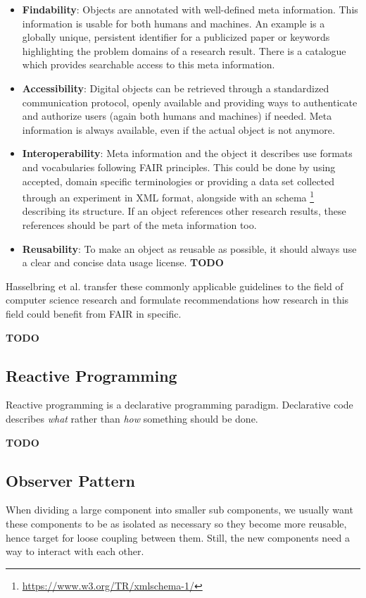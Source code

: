 \documentclass[12pt,a4paper]{article}
\begin{document}
\begin{itemize}
	\item \textbf{Findability}: Objects are annotated with well-defined meta information. This information is usable for both humans and machines. An example is a globally unique, persistent identifier for a publicized paper or keywords highlighting the problem domains of a research result. There is a catalogue which provides searchable access to this meta information.
	\item \textbf{Accessibility}: Digital objects can be retrieved through a standardized communication protocol, openly available and providing ways to authenticate and authorize users (again both humans and machines) if needed. Meta information is always available, even if the actual object is not anymore.
	\item \textbf{Interoperability}: Meta information and the object it describes use formats and vocabularies following FAIR principles. This could be done by using accepted, domain specific terminologies or providing a data set collected through an experiment in XML format, alongside with an schema \footnote{\url{https://www.w3.org/TR/xmlschema-1/}} describing its structure. If an object references other research results, these references should be part of the meta information too.
	\item \textbf{Reusability}: To make an object as reusable as possible, it should always use a clear and concise data usage license. \textbf{TODO}
\end{itemize}

Hasselbring et al. \cite{2019arXiv190805986H} transfer these commonly applicable guidelines to the field of computer science research and formulate recommendations how research in this field could benefit from FAIR in specific.

\textbf{TODO}

\subsection{Reactive Programming}
Reactive programming is a declarative programming paradigm. Declarative code describes \emph{what} rather than \emph{how} something should be done.

\textbf{TODO}

\subsection{Observer Pattern}
When dividing a large component into smaller sub components, we usually want these components to be as isolated as necessary so they become more reusable, hence target for loose coupling between them. Still, the new components need a way to interact with each other.
\end{document}
